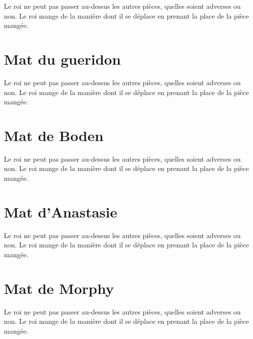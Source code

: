 \documentclass[a5paper,openany,twocolumn]{book}
\begin{document}
{Le roi ne peut pas passer au-dessus les autres pièces, quelles soient adverses ou non. Le roi mange de la manière dont il se déplace en prenant la place de la pièce mangée. 


\chapter{Mat du gueridon}

Le roi ne peut pas passer au-dessus les autres pièces, quelles soient adverses ou non. Le roi mange de la manière dont il se déplace en prenant la place de la pièce mangée. 

 
\chapter{Mat de Boden}

Le roi ne peut pas passer au-dessus les autres pièces, quelles soient adverses ou non. Le roi mange de la manière dont il se déplace en prenant la place de la pièce mangée. 

 
\chapter{Mat d'Anastasie}

Le roi ne peut pas passer au-dessus les autres pièces, quelles soient adverses ou non. Le roi mange de la manière dont il se déplace en prenant la place de la pièce mangée. 

 
\chapter{Mat de Morphy}

Le roi ne peut pas passer au-dessus les autres pièces, quelles soient adverses ou non. Le roi mange de la manière dont il se déplace en prenant la place de la pièce mangée. 

}
\end{document}
